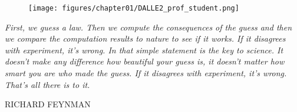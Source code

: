 \begin{figure}[h]
  \centering

  \texttt{[image: figures/chapter01/DALLE2\_prof\_student.png]}
  \label{}
\end{figure}

\vfill

{
\textit{\justify
   First, we guess a law. Then we compute the consequences of the guess and then we compare the computation results to nature to see if it works.
  If it disagrees with experiment, it's wrong. In that simple statement is the key to science.
   It doesn't make any difference how beautiful your guess is, it doesn't matter how smart you are who made the guess. If it disagrees with experiment, it's wrong. That's all there is to it.}

  \par\bigskip
  \raggedleft\MakeUppercase{Richard Feynman}\par%
}

\vspace{4em}
%
%
%
%

\vfill




